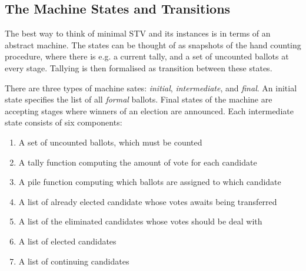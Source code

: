 \documentclass{llncs}
\begin{document}

\subsection{The Machine States and Transitions}

The best way to think of minimal STV and its instances is in terms
of an abstract machine. The states can be thought of
as snapshots of the hand counting procedure, where there is e.g. a
current tally, and a set of uncounted ballots at every stage.
Tallying is then formalised as transition between these states. 

There are three types of machine sates: \emph{initial},
\emph{intermediate}, and \emph{final}. An initial state specifies
the list of all \emph{formal} ballots. 
Final states of the machine are accepting stages where
winners of an election are announced. Each intermediate state
consists of six components: \begin{enumerate}
\item A set of uncounted ballots, which must be counted
\item A tally function computing the amount of vote for each candidate
\item A pile function computing which ballots are assigned to which candidate
\item A list of already elected candidate whose votes awaits being transferred
\item A list of the eliminated candidates whose votes should be deal with
\item A list of elected candidates
\item A list of continuing candidates 
\end{enumerate}  
\end{document}
